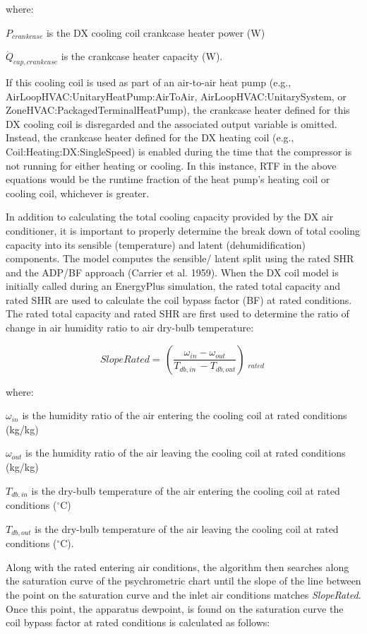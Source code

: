 where:

\({P_{crankcase}}\) is the DX cooling coil crankcase heater power (W)

\(\dot{Q}_{cap,crankcase}\) is the crankcase heater capacity (W).

If this cooling coil is used as part of an air-to-air heat pump (e.g., AirLoopHVAC:UnitaryHeatPump:AirToAir, AirLoopHVAC:UnitarySystem, or ZoneHVAC:PackagedTerminalHeatPump), the crankcase heater defined for this DX cooling coil is disregarded and the associated output variable is omitted. Instead, the crankcase heater defined for the DX heating coil (e.g., Coil:Heating:DX:SingleSpeed) is enabled during the time that the compressor is not running for either heating or cooling. In this instance, RTF in the above equations would be the runtime fraction of the heat pump's heating coil or cooling coil, whichever is greater.

In addition to calculating the total cooling capacity provided by the DX air conditioner, it is important to properly determine the break down of total cooling capacity into its sensible (temperature) and latent (dehumidification) components. The model computes the sensible/ latent split using the rated SHR and the ADP/BF approach (Carrier et al. 1959). When the DX coil model is initially called during an EnergyPlus simulation, the rated total capacity and rated SHR are used to calculate the coil bypass factor (BF) at rated conditions. The rated total capacity and rated SHR are first used to determine the ratio of change in air humidity ratio to air dry-bulb temperature:

\begin{equation}
SlopeRated = \,\left( {\frac{{{\omega_{in}} - {\omega_{out}}}}{{{T_{db,in}}\, - {T_{db,out}}}}} \right)\mathop {}\limits_{rated}
\end{equation}

where:

\(\omega_{in}\) is the humidity ratio of the air entering the cooling coil at rated conditions (kg/kg)

\(\omega_{out}\) is the humidity ratio of the air leaving the cooling coil at rated conditions (kg/kg)

\(T_{db,in}\) is the dry-bulb temperature of the air entering the cooling coil at rated conditions (\(^{\circ}\)C)

\(T_{db,out}\) is the dry-bulb temperature of the air leaving the cooling coil at rated conditions (\(^{\circ}\)C).

Along with the rated entering air conditions, the algorithm then searches along the saturation curve of the psychrometric chart until the slope of the line between the point on the saturation curve and the inlet air conditions matches \emph{SlopeRated}. Once this point, the apparatus dewpoint, is found on the saturation curve the coil bypass factor at rated conditions is calculated as follows:

